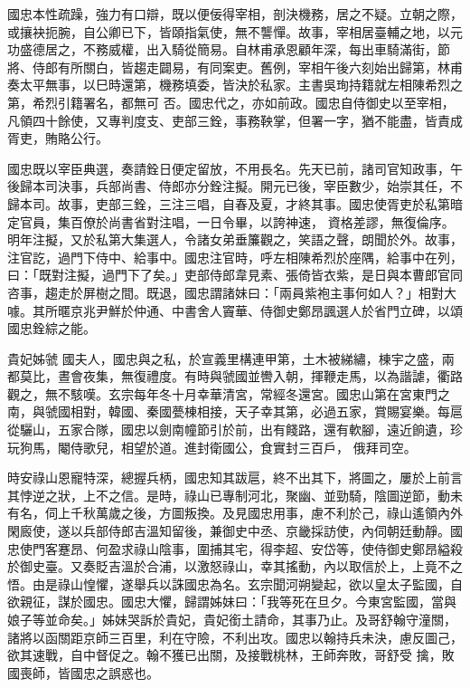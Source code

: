 \begin{pinyinscope}
 國忠本性疏躁，強力有口辯，既以便佞得宰相，剖決機務，居之不疑。立朝之際，或攘袂扼腕，自公卿已下，皆頤指氣使，無不讋憚。故事，宰相居臺輔之地，以元功盛德居之，不務威權，出入騎從簡易。自林甫承恩顧年深，每出車騎滿街，節將、侍郎有所關白，皆趨走闢易，有同案吏。舊例，宰相午後六刻始出歸第，林甫奏太平無事，以巳時還第，機務填委，皆決於私家。主書吳珣持籍就左相陳希烈之第，希烈引籍署名，都無可
 否。國忠代之，亦如前政。國忠自侍御史以至宰相，凡領四十餘使，又專判度支、吏部三銓，事務鞅掌，但署一字，猶不能盡，皆責成胥吏，賄賂公行。



 國忠既以宰臣典選，奏請銓日便定留放，不用長名。先天已前，諸司官知政事，午後歸本司決事，兵部尚書、侍郎亦分銓注擬。開元已後，宰臣數少，始崇其任，不歸本司。故事，吏部三銓，三注三唱，自春及夏，才終其事。國忠使胥吏於私第暗定官員，集百僚於尚書省對注唱，一日令畢，以誇神速，
 資格差謬，無復倫序。明年注擬，又於私第大集選人，令諸女弟垂簾觀之，笑語之聲，朗聞於外。故事，注官訖，過門下侍中、給事中。國忠注官時，呼左相陳希烈於座隅，給事中在列，曰：「既對注擬，過門下了矣。」吏部侍郎韋見素、張倚皆衣紫，是日與本曹郎官同咨事，趨走於屏樹之間。既退，國忠謂諸妹曰：「兩員紫袍主事何如人？」相對大噱。其所暱京兆尹鮮於仲通、中書舍人竇華、侍御史鄭昂諷選人於省門立碑，以頌國忠銓綜之能。



 貴妃姊虢
 國夫人，國忠與之私，於宣義里構連甲第，土木被綈繡，棟宇之盛，兩都莫比，晝會夜集，無復禮度。有時與虢國並轡入朝，揮鞭走馬，以為諧謔，衢路觀之，無不駭嘆。玄宗每年冬十月幸華清宮，常經冬還宮。國忠山第在宮東門之南，與虢國相對，韓國、秦國甍棟相接，天子幸其第，必過五家，賞賜宴樂。每扈從驪山，五家合隊，國忠以劍南幢節引於前，出有餞路，還有軟腳，遠近餉遺，珍玩狗馬，閹侍歌兒，相望於道。進封衛國公，食實封三百戶，
 俄拜司空。



 時安祿山恩寵特深，總握兵柄，國忠知其跋扈，終不出其下，將圖之，屢於上前言其悖逆之狀，上不之信。是時，祿山已專制河北，聚幽、並勁騎，陰圖逆節，動未有名，伺上千秋萬歲之後，方圖叛換。及見國忠用事，慮不利於己，祿山遙領內外閑廄使，遂以兵部侍郎吉溫知留後，兼御史中丞、京畿採訪使，內伺朝廷動靜。國忠使門客蹇昂、何盈求祿山陰事，圍捕其宅，得李超、安岱等，使侍御史鄭昂縊殺
 於御史臺。又奏貶吉溫於合浦，以激怒祿山，幸其搖動，內以取信於上，上竟不之悟。由是祿山惶懼，遂舉兵以誅國忠為名。玄宗聞河朔變起，欲以皇太子監國，自欲親征，謀於國忠。國忠大懼，歸謂姊妹曰：「我等死在旦夕。今東宮監國，當與娘子等並命矣。」姊妹哭訴於貴妃，貴妃銜土請命，其事乃止。及哥舒翰守潼關，諸將以函關距京師三百里，利在守險，不利出攻。國忠以翰持兵未決，慮反圖己，欲其速戰，自中督促之。翰不獲已出關，及接戰桃林，王師奔敗，哥舒受
 擒，敗國喪師，皆國忠之誤惑也。




\end{pinyinscope}
